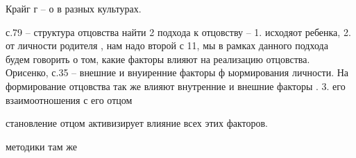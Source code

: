 \documentclass{../../common/thesisbyxetex}
\begin{document}
Крайг г – о в разных культурах.



с.79 – структура отцовства
найти
2 подхода к отцовству – 1. исходяот ребенка,
2. от личности родителя \cite[11]{psyot}, нам надо второй
с 11, мы в рамках данного подхода будем говорить о том, какие факторы влияют на реализацию 
отцовства.
Орисенко, с.35 – внешние и внуиренние факторы ф ыормирования личности. На формирование отцовства так 
же влияют внутренние и внешние факторы \cite[35]{psyot}.
3. его взаимоотношения с его отцом \cite[49]{rah}


становление отцом активизирует влияние всех этих факторов.

методики там же




\printbibliography[env=gostbibliography,sorting=ntvy]
\end{document}
